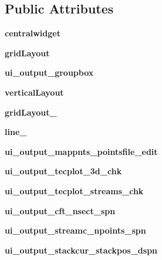\subsection*{Public Attributes}
\begin{DoxyCompactItemize}
\item 
\hypertarget{a00077_a99bcc614e5be2356b9b0e54f30bb009e}{}\label{a00077_a99bcc614e5be2356b9b0e54f30bb009e} 
{\bfseries centralwidget}
\item 
\hypertarget{a00077_aad085c53319e511b5f37895a71336716}{}\label{a00077_aad085c53319e511b5f37895a71336716} 
{\bfseries grid\+Layout}
\item 
\hypertarget{a00077_a342c5c54417df97a32a10f28fe93d81e}{}\label{a00077_a342c5c54417df97a32a10f28fe93d81e} 
{\bfseries ui\+\_\+output\+\_\+groupbox}
\item 
\hypertarget{a00077_ae33ea0222b6e62c39a7081946f32072a}{}\label{a00077_ae33ea0222b6e62c39a7081946f32072a} 
{\bfseries vertical\+Layout}
\item 
\hypertarget{a00077_ad528f27c7c549b388b9a6dc2e24f9880}{}\label{a00077_ad528f27c7c549b388b9a6dc2e24f9880} 
{\bfseries grid\+Layout\+\_}
\item 
\hypertarget{a00077_a55227446d0a73588ace14f77945ec2ee}{}\label{a00077_a55227446d0a73588ace14f77945ec2ee} 
{\bfseries line\+\_}
\item 
\hypertarget{a00077_a8020c73e1cf12f6c112a79f2c34af062}{}\label{a00077_a8020c73e1cf12f6c112a79f2c34af062} 
{\bfseries ui\+\_\+output\+\_\+mappnts\+\_\+pointsfile\+\_\+edit}
\item 
\hypertarget{a00077_a47635280e1268bda03a8e1f69a03fc35}{}\label{a00077_a47635280e1268bda03a8e1f69a03fc35} 
{\bfseries ui\+\_\+output\+\_\+tecplot\+\_\+3d\+\_\+chk}
\item 
\hypertarget{a00077_a08c1ff077d7bec4a77e7f540b681c71a}{}\label{a00077_a08c1ff077d7bec4a77e7f540b681c71a} 
{\bfseries ui\+\_\+output\+\_\+tecplot\+\_\+streams\+\_\+chk}
\item 
\hypertarget{a00077_a7689384c6c651ee544d44f0029a731b5}{}\label{a00077_a7689384c6c651ee544d44f0029a731b5} 
{\bfseries ui\+\_\+output\+\_\+cft\+\_\+nsect\+\_\+spn}
\item 
\hypertarget{a00077_a7376266aa4a7bdb95b74e14c4e2294c0}{}\label{a00077_a7376266aa4a7bdb95b74e14c4e2294c0} 
{\bfseries ui\+\_\+output\+\_\+streamc\+\_\+npoints\+\_\+spn}
\item 
\hypertarget{a00077_a51d1efb48954a11443baee2265fb4a2a}{}\label{a00077_a51d1efb48954a11443baee2265fb4a2a} 
{\bfseries ui\+\_\+output\+\_\+stackcur\+\_\+stackpos\+\_\+dspn}

\end{DoxyCompactItemize}
